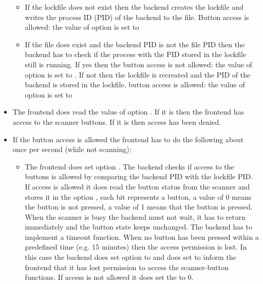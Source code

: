 \documentclass[11pt,DVIps]{report}
\begin{document}
\begin{changebar}
\begin{itemize}
  \begin{itemize}
  \item
  If the lockfile does not exist then the backend creates the lockfile and writes the
  process ID (PID) of the backend to the file. Button access is allowed: the value
  of option  is set to 
  \item
  If the file does exist and the backend PID is not the file PID then the
  backend has to check if the process with the PID stored in the lockfile
  still is running. If yes then the button access is not allowed: the value of
  option  is set to . If not then the lockfile
  is recreated and the PID of the backend is stored in the lockfile, button
  access is allowed: the value of option  is set to 
  \end{itemize}

\item
The frontend does read the value of option . If
it is  then the frontend has access to the scanner buttons.
If it is  then access has been denied.

\item
If the button access is allowed the frontend has to do the following about
once per second (while not scanning):
  \begin{itemize}
  \item
  The frontend does set option .
  The backend checks if access to the buttons is allowed by comparing
  the backend PID with the lockfile PID. If access is allowed it
  does read the button status from the scanner and stores it in
  the option , each bit represents a button, a
  value of 0 means the button is not pressed, a value of 1 means that the button
  is pressed. When the scanner is busy the backend must not wait, it has to
  return immediately and the button state keeps unchanged.
  The backend has to implement a timeout function. When no button has been pressed
  within a predefined time (e.g. 15 minutes) then the access permission is lost.
  In this case the backend does set option  to 
  and does set  to inform the frontend that it has
  lost permission to access the scanner-button functions.
  If access is not allowed it does set the  to 0.


\end{itemize}
\end{itemize}
\end{changebar}
\end{document}
